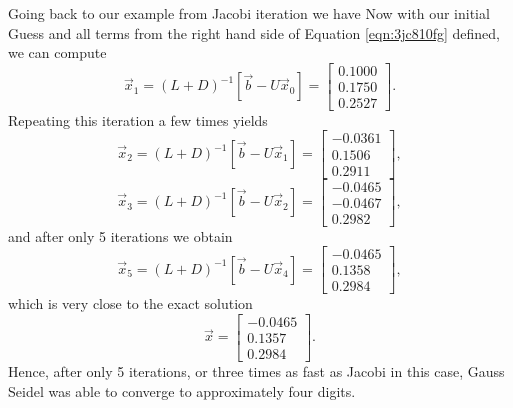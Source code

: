 Going back to our example from Jacobi iteration we have
Now with our initial Guess and all terms from the right hand side of Equation \ref{eqn:3jc810fg} defined, we can compute
\begin{equation}
	\vec{x}_{1} = (L + D)^{-1}\left[ \vec{b} - U\vec{x}_0 \right] = \begin{bmatrix}
	    0.1000 \\
	    0.1750 \\
			0.2527
	\end{bmatrix}.
\end{equation}
Repeating this iteration a few times yields
\begin{equation}
	\vec{x}_{2} = (L + D)^{-1}\left[ \vec{b} - U\vec{x}_1 \right] = \begin{bmatrix}
	    -0.0361 \\
	    0.1506 \\
			0.2911
	\end{bmatrix},
\end{equation}
\begin{equation}
	\vec{x}_{3} = (L + D)^{-1}\left[ \vec{b} - U\vec{x}_2 \right] = \begin{bmatrix}
	    -0.0465 \\
	    -0.0467 \\
			0.2982
	\end{bmatrix},
\end{equation}
and after only 5 iterations we obtain
\begin{equation}
		\vec{x}_{5} = (L + D)^{-1}\left[ \vec{b} - U\vec{x}_4 \right] = \begin{bmatrix}
	    -0.0465 \\
	    0.1358 \\
			0.2984
	\end{bmatrix},
\end{equation}
which is very close to the exact solution
\begin{equation}
	\vec{x} = \begin{bmatrix}
	    -0.0465 \\
	    0.1357 \\
			0.2984
	\end{bmatrix}.
\end{equation}
Hence, after only 5 iterations, or three times as fast as Jacobi in this case, Gauss Seidel was able to converge to approximately four digits.

